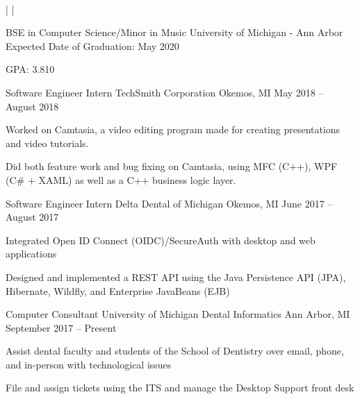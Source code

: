 \documentclass[]{awesome-cv}
\begin{document}
    
\begin{center}
	  \\

	{} | {} | {}
\end{center}
\vspace{-4mm}
\vspace{-2mm}
\cventry
	{BSE in Computer Science/Minor in Music}
	{University of Michigan - Ann Arbor}
	{}
	{Expected Date of Graduation: May 2020}
	{\begin{cvitems}
		\item{GPA: 3.810}
		\end{cvitems}}

\vspace{-6mm}
\vspace{-3mm}

	\cventry
	{Software Engineer Intern}
	{TechSmith Corporation}
	{Okemos, MI}
	{May 2018 – August 2018}
	{\begin{cvitems}
		\item {Worked on Camtasia, a video editing program made for creating presentations and video tutorials.}
		\item {Did both feature work and bug fixing on Camtasia, using MFC (C++), WPF (C\# + XAML) as well as a C++ business logic layer.}
		\end{cvitems}}

	\vspace{-4mm}
	\cventry
	{Software Engineer Intern}
	{Delta Dental of Michigan}
	{Okemos, MI}
	{June 2017 – August 2017}
	{\begin{cvitems}
		\item {Integrated Open ID Connect (OIDC)/SecureAuth with desktop and web applications}
		\item {Designed and implemented a REST API using the Java Persistence API (JPA), Hibernate, Wildfly, and Enterprise JavaBeans (EJB)}
		\end{cvitems}}

	\vspace{-4mm}
	\cventry
	{Computer Consultant}
	{University of Michigan Dental Informatics}
	{Ann Arbor, MI}
	{September 2017 – Present}
	{\begin{cvitems}
		\item {Assist dental faculty and students of the School of Dentistry over email, phone, and in-person with technological issues}
		\item {File and assign tickets using the ITS and manage the Desktop Support front desk}
		\end{cvitems}}
\end{document}
